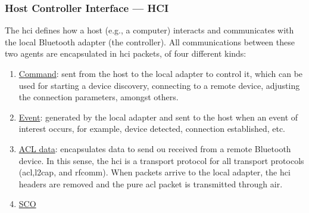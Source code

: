 \subsubsection{Host Controller Interface --- HCI}%
\label{sec:bt-hci}
%
The \gls{hci} defines how a host (e.g., a computer) interacts and communicates
with the local Bluetooth adapter (the controller). All communications between
these two agents are encapsulated in \gls{hci} packets, of four different kinds:
\begin{enumerate}
\item \uline{Command}: sent from the host to the local adapter to control it,
  which can be used for starting a device discovery, connecting to a remote
  device, adjusting the connection parameters, amongst others.
\item \uline{Event}: generated by the local adapter and sent to the host when an
  event of interest occurs, for example, device detected, connection
  established, etc.
\item \uline{ACL data}: encapsulates data to send ou received from a remote
  Bluetooth device. In this sense, the \gls{hci} is a transport protocol for all
  transport protocols (\gls{acl},\gls{l2cap}, and \gls{rfcomm}). When packets
  arrive to the local adapter, the \gls{hci} headers are removed and the pure
  \gls{acl} packet is transmitted through air.
\item \uline{SCO}
\end{enumerate}

